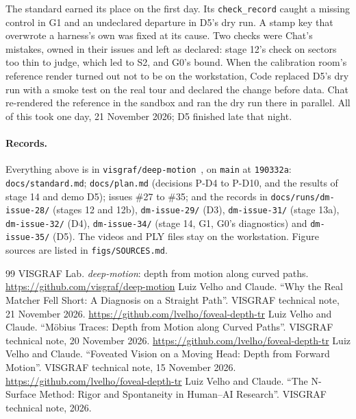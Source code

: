 \documentclass[11pt,a4paper]{article}
\newcommand{\code}[1]{\texttt{\small #1}}
\newcommand{\pth}[1]{{\small\nolinkurl{#1}}}   %
\begin{document}
The standard earned its place on the first day. Its \code{check\_record} caught a missing control in G1 and an
undeclared departure in D5's dry run. A stamp key that overwrote a harness's own was fixed at its cause.
Two checks were Chat's mistakes, owned in their issues and left as declared: stage 12's check on sectors too thin to
judge, which led to S2, and G0's bound. When the calibration room's reference render turned out not to be on the
workstation, Code replaced D5's dry run with a smoke test on the real tour and declared the change before data. Chat
re-rendered the reference in the sandbox and ran the dry run there in parallel. All of this took one day,
21 November 2026; D5 finished late that night.

\paragraph{Records.} Everything above is in \code{visgraf/deep-motion}~\cite{dm}, on \code{main} at \code{190332a}:
\pth{docs/standard.md}; \pth{docs/plan.md} (decisions P-D4 to P-D10, and the results of stage 14 and demo D5); issues
\#27 to \#35; and the records in \pth{docs/runs/dm-issue-28/} (stages 12 and 12b), \pth{dm-issue-29/} (D3),
\pth{dm-issue-31/} (stage 13a), \pth{dm-issue-32/} (D4), \pth{dm-issue-34/} (stage 14, G1, G0's diagnostics) and
\pth{dm-issue-35/} (D5). The videos and PLY files stay on the workstation. Figure sources are listed in
\pth{figs/SOURCES.md}.

\begin{thebibliography}{99}
 VISGRAF Lab. \emph{deep-motion}: depth from motion along curved paths.
  \url{https://github.com/visgraf/deep-motion}
 Luiz Velho and Claude. ``Why the Real Matcher Fell Short: A Diagnosis on a Straight Path''. VISGRAF
  technical note, 21 November 2026. \url{https://github.com/lvelho/foveal-depth-tr}
 Luiz Velho and Claude. ``M\"obius Traces: Depth from Motion along Curved Paths''. VISGRAF technical note,
  20 November 2026. \url{https://github.com/lvelho/foveal-depth-tr}
 Luiz Velho and Claude. ``Foveated Vision on a Moving Head: Depth from Forward Motion''. VISGRAF technical
  note, 15 November 2026. \url{https://github.com/lvelho/foveal-depth-tr}
 Luiz Velho and Claude. ``The N-Surface Method: Rigor and Spontaneity in Human--AI Research''.
  VISGRAF technical note, 2026.
\end{thebibliography}
\end{document}
